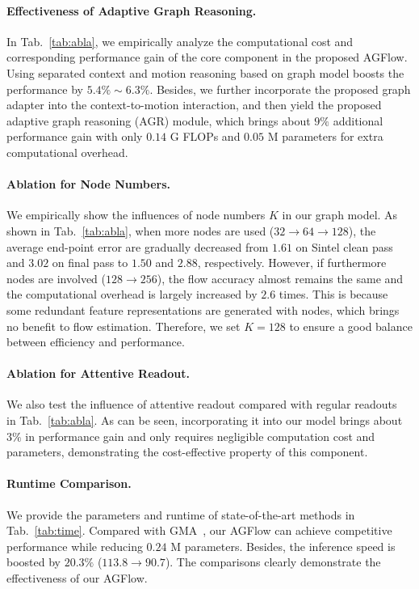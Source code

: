 \documentclass[letterpaper]{article} %
\begin{document}
\paragraph{Effectiveness of Adaptive Graph Reasoning.}
In Tab.~\ref{tab:abla}, we empirically analyze the computational cost and corresponding performance gain of the core component in the proposed AGFlow. Using separated context and motion reasoning based on graph model boosts the performance by $5.4\% \sim 6.3\%$. Besides, we further incorporate the proposed graph adapter into the context-to-motion interaction, and then yield the proposed adaptive graph reasoning (AGR) module, which brings about $9\%$ additional performance gain with only $0.14$ G FLOPs and $0.05$ M parameters for extra computational overhead.

\paragraph{Ablation for Node Numbers.}
We empirically show the influences of node numbers $K$ in our graph model. As shown in Tab.~\ref{tab:abla}, when more nodes are used ($32 \rightarrow 64 \rightarrow 128$), the average end-point error are gradually decreased from $1.61$ on Sintel clean pass and $3.02$ on final pass to $1.50$ and $2.88$, respectively. However, if furthermore nodes are involved ($128 \rightarrow 256$), the flow accuracy almost remains the same and the computational overhead is largely increased by $2.6$ times. This is because some redundant feature representations are generated with nodes, which brings no benefit to flow estimation. Therefore, we set $K = 128$ to ensure a good balance between efficiency and performance.

\paragraph{Ablation for Attentive Readout.}
We also test the influence of attentive readout compared with regular readouts~\cite{Li2018BeyondGL} in Tab.~\ref{tab:abla}. As can be seen, incorporating it into our model brings about $3\%$ in performance gain and only requires negligible computation cost and parameters, demonstrating the cost-effective property of this component. 

\paragraph{Runtime Comparison.}
We provide the parameters and runtime of state-of-the-art methods in Tab.~\ref{tab:time}. Compared with GMA~\cite{Jiang2021LearningTE}, our AGFlow can achieve competitive performance while reducing $0.24$ M parameters. Besides, the inference speed is boosted by $20.3\%$ ($113.8 \rightarrow 90.7$). The comparisons clearly demonstrate the effectiveness of our AGFlow.
\end{document}
